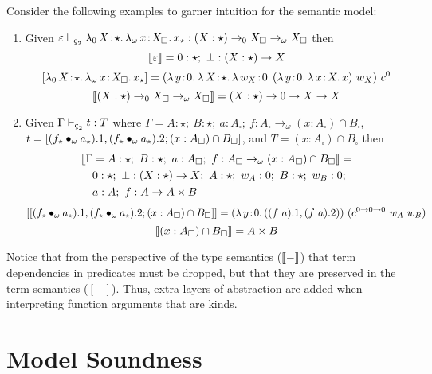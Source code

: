 Consider the following examples to garner intuition for the semantic model:
\begin{enumerate}
    \item {
        Given $\varepsilon \vdash_{\ced} \abs{\lambda_0}{X}{\star}{
            \abs{\lambda_\omega}{x}{X_\square}{x_\star}
        } : (X : \star) \to_0 X_\square \to_\omega X_\square$
        then $$\llbracket \varepsilon \rrbracket = 0 : \star;\ \bot : (X : \star) \to X$$
        $$[\abs{\lambda_0}{X}{\star}{
            \abs{\lambda_\omega}{x}{X_\square}{x_\star}
        }] = (\abs{\lambda}{y}{0}{
            \abs{\lambda}{X}{\star}{
                \abs{\lambda}{w_X}{0}{
                    (\abs{\lambda}{y}{0}
                        \abs{\lambda}{x}{X}{x}
                    )\ w_X
                }
            }
        })\ c^0$$
        $$\llbracket (X : \star) \to_0 X_\square \to_\omega X_\square \rrbracket
            = (X : \star) \to 0 \to X \to X$$
    }
    \item {
        Given $\Gamma \vdash_{\ced} t : T$ where $\Gamma = A : \star;\ B : \star;\ a : A_\square;\ f : A_\square \to_\omega (x : A_\square) \cap B_\square$, $t = [(f_\star \bullet_{\omega} a_\star).1, (f_\star \bullet_{\omega} a_\star).2; (x : A_\square) \cap B_\square]$, and $T = (x : A_\square) \cap B_\square$ then
        \begin{align*}
            &\sema{\Gamma = A : \star;\ B : \star;\ a : A_\square;\ f : A_\square \to_\omega (x : A_\square) \cap B_\square} =\\
            &\quad 0 : \star;\ \bot : (X : \star) \to X;\ A : \star;\ w_A : 0;\ B : \star;\ w_B : 0; \\
            &\quad a : A;\ f : A \to A \times B
        \end{align*}
            $$[[(f_\star \bullet_{\omega} a_\star).1, (f_\star \bullet_{\omega} a_\star).2; (x : A_\square) \cap B_\square]] = ({\lambda}\, y\! : \! 0.\, 
                ((f\ a).1, (f\ a).2)
           )\ (c^{0 \to 0 \to 0}\ w_A\ w_B)$$
        $$\llbracket (x : A_\square) \cap B_\square \rrbracket = A \times B$$
    }
\end{enumerate}

Notice that from the perspective of the type semantics ($\llbracket - \rrbracket$) that term dependencies in predicates must be dropped, but that they are preserved in the term semantics ($[-]$).
Thus, extra layers of abstraction are added when interpreting function arguments that are kinds.

\section{Model Soundness}

